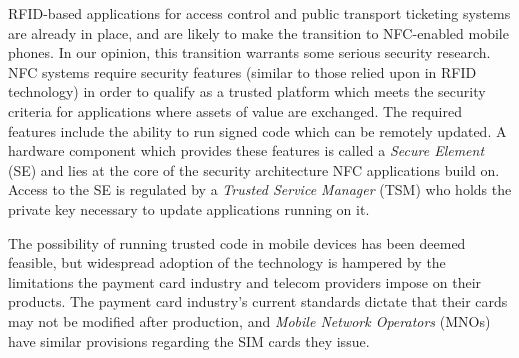 RFID-based applications for access control and public transport ticketing systems are already in place, and are likely to make the transition to NFC-enabled mobile phones.
In our opinion, this transition warrants some serious security research.
NFC systems require security features (similar to those relied upon in RFID technology) in order to qualify as a trusted platform which meets the security criteria for applications where assets of value are exchanged.
The required features include the ability to run signed code which can be remotely updated.
A hardware component which provides these features is called a \textit{Secure Element} (SE) and lies at the core of the security architecture NFC applications build on.
Access to the SE is regulated by a \textit{Trusted Service Manager} (TSM) who holds the private key necessary to update applications running on it.

The possibility of running trusted code in mobile devices has been deemed feasible, but widespread adoption of the technology is hampered by the limitations the payment card industry and telecom providers impose on their products.
The payment card industry's current standards dictate that their cards may not be modified after production, and \textit{Mobile Network Operators} (MNOs) have similar provisions regarding the SIM cards they issue.


